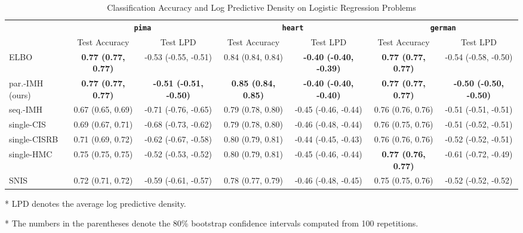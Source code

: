 
\begin{table*}
  \centering
  \caption{Classification Accuracy and Log Predictive Density on Logistic Regression Problems}\label{table:logistic}
  \setlength{\tabcolsep}{3pt}
  \begin{threeparttable}
  \begin{tabular}{lcccccc}
    \toprule
     & \multicolumn{2}{c}{\textbf{\texttt{pima}}} & \multicolumn{2}{c}{\textbf{\texttt{heart}}} & \multicolumn{2}{c}{\textbf{\texttt{german}}} \\
    \cmidrule(lr){2-3}\cmidrule(lr){4-5}\cmidrule(lr){6-7}
    & Test Accuracy & Test LPD
    & Test Accuracy & Test LPD
    & Test Accuracy & Test LPD \\\midrule
    ELBO & \textbf{0.77 {\scriptsize(0.77, 0.77)}} & -0.53 {\scriptsize(-0.55, -0.51)} & 0.84 {\scriptsize(0.84, 0.84)} & \textbf{-0.40 {\scriptsize(-0.40, -0.39)}} & \textbf{0.77 {\scriptsize(0.77, 0.77)}} & -0.54 {\scriptsize(-0.58, -0.50)}  \\\arrayrulecolor{black!30}\midrule
    par.-IMH (ours) & \textbf{0.77 {\scriptsize(0.77, 0.77)}} & \textbf{-0.51 {\scriptsize(-0.51, -0.50)}} & \textbf{0.85 {\scriptsize(0.84, 0.85)}} & \textbf{-0.40 {\scriptsize(-0.40, -0.40)}} & \textbf{0.77 {\scriptsize(0.77, 0.77)}} & \textbf{-0.50 {\scriptsize(-0.50, -0.50)}} \\
    seq.-IMH & 0.67 {\scriptsize(0.65, 0.69)} & -0.71 {\scriptsize(-0.76, -0.65)} & 0.79 {\scriptsize(0.78, 0.80)} & -0.45 {\scriptsize(-0.46, -0.44)} & 0.76 {\scriptsize(0.76, 0.76)} & -0.51 {\scriptsize(-0.51, -0.51)} \\
    single-CIS & 0.69 {\scriptsize(0.67, 0.71)} & -0.68 {\scriptsize(-0.73, -0.62)} & 0.79 {\scriptsize(0.78, 0.80)} & -0.46 {\scriptsize(-0.48, -0.44)} & 0.76 {\scriptsize(0.75, 0.76)} & -0.51 {\scriptsize(-0.52, -0.51)} \\
    single-CISRB & 0.71 {\scriptsize(0.69, 0.72)} & -0.62 {\scriptsize(-0.67, -0.58)} & 0.80 {\scriptsize(0.79, 0.81)} & -0.44 {\scriptsize(-0.45, -0.43)} & 0.76 {\scriptsize(0.76, 0.76)} & -0.52 {\scriptsize(-0.52, -0.51)} \\
    single-HMC & 0.75 {\scriptsize(0.75, 0.75)} & -0.52 {\scriptsize(-0.53, -0.52)} & 0.80 {\scriptsize(0.79, 0.81)} & -0.45 {\scriptsize(-0.46, -0.44)} & \textbf{0.77 {\scriptsize(0.76, 0.77)}} & -0.61 {\scriptsize(-0.72, -0.49)} \\
    SNIS & 0.72 {\scriptsize(0.71, 0.72)} & -0.59 {\scriptsize(-0.61, -0.57)} & 0.78 {\scriptsize(0.77, 0.79)} & -0.46 {\scriptsize(-0.48, -0.45)} & 0.75 {\scriptsize(0.75, 0.76)} & -0.52 {\scriptsize(-0.52, -0.52)} \\\bottomrule
  \end{tabular}
  \begin{tablenotes}
    \item[*]{\footnotesize LPD denotes the average log predictive density.}
    \item[*]{\footnotesize The numbers in the parentheses denote the 80\% bootstrap confidence intervals computed from 100 repetitions.}
  \end{tablenotes}
  \end{threeparttable}
\end{table*}

